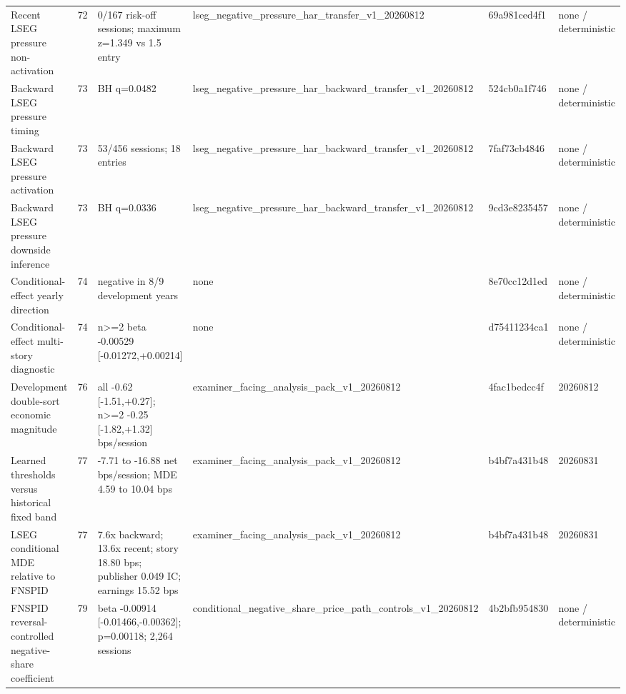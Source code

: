 \begin{longtable}{p{3.1cm} r p{3.2cm} p{3.3cm} l p{1.8cm}}
Recent LSEG pressure non-activation & 72 & 0/167 risk-off sessions; maximum z=1.349 vs 1.5 entry & lseg\_\allowbreak{}negative\_\allowbreak{}pressure\_\allowbreak{}har\_\allowbreak{}transfer\_\allowbreak{}v1\_\allowbreak{}20260812 & 69a981ced4f1 & none / deterministic \\
Backward LSEG pressure timing & 73 & BH q=0.0482 & lseg\_\allowbreak{}negative\_\allowbreak{}pressure\_\allowbreak{}har\_\allowbreak{}backward\_\allowbreak{}transfer\_\allowbreak{}v1\_\allowbreak{}20260812 & 524cb0a1f746 & none / deterministic \\
Backward LSEG pressure activation & 73 & 53/456 sessions; 18 entries & lseg\_\allowbreak{}negative\_\allowbreak{}pressure\_\allowbreak{}har\_\allowbreak{}backward\_\allowbreak{}transfer\_\allowbreak{}v1\_\allowbreak{}20260812 & 7faf73cb4846 & none / deterministic \\
Backward LSEG pressure downside inference & 73 & BH q=0.0336 & lseg\_\allowbreak{}negative\_\allowbreak{}pressure\_\allowbreak{}har\_\allowbreak{}backward\_\allowbreak{}transfer\_\allowbreak{}v1\_\allowbreak{}20260812 & 9cd3e8235457 & none / deterministic \\
Conditional-effect yearly direction & 74 & negative in 8/9 development years & none & 8e70cc12d1ed & none / deterministic \\
Conditional-effect multi-story diagnostic & 74 & n>=2 beta -0.00529 [-0.01272,+0.00214] & none & d75411234ca1 & none / deterministic \\
Development double-sort economic magnitude & 76 & all -0.62 [-1.51,+0.27]; n>=2 -0.25 [-1.82,+1.32] bps/session & examiner\_\allowbreak{}facing\_\allowbreak{}analysis\_\allowbreak{}pack\_\allowbreak{}v1\_\allowbreak{}20260812 & 4fac1bedcc4f & 20260812 \\
Learned thresholds versus historical fixed band & 77 & -7.71 to -16.88 net bps/session; MDE 4.59 to 10.04 bps & examiner\_\allowbreak{}facing\_\allowbreak{}analysis\_\allowbreak{}pack\_\allowbreak{}v1\_\allowbreak{}20260812 & b4bf7a431b48 & 20260831 \\
LSEG conditional MDE relative to FNSPID & 77 & 7.6x backward; 13.6x recent; story 18.80 bps; publisher 0.049 IC; earnings 15.52 bps & examiner\_\allowbreak{}facing\_\allowbreak{}analysis\_\allowbreak{}pack\_\allowbreak{}v1\_\allowbreak{}20260812 & b4bf7a431b48 & 20260831 \\
FNSPID reversal-controlled negative-share coefficient & 79 & beta -0.00914 [-0.01466,-0.00362]; p=0.00118; 2,264 sessions & conditional\_\allowbreak{}negative\_\allowbreak{}share\_\allowbreak{}price\_\allowbreak{}path\_\allowbreak{}controls\_\allowbreak{}v1\_\allowbreak{}20260812 & 4b2bfb954830 & none / deterministic \\
\bottomrule
\end{longtable}
\endgroup
